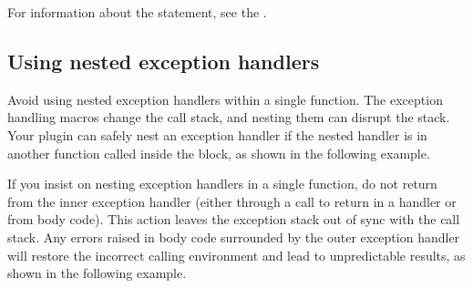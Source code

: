 \documentclass[letterpaper,12pt,english,openany,oneside]{sphinxmanual}
\begin{document}
\begin{sphinxVerbatim}[commandchars=\\\{\}]
  
    
      
\end{sphinxVerbatim}

For information about the  statement, see the .


\subsection{Using nested exception handlers}
\label{\detokenize{Plugins_Exceptions:using-nested-exception-handlers}}
Avoid using nested exception handlers within a single function. The exception handling macros change the call stack, and nesting them can disrupt the stack. Your plugin can safely nest an exception handler if the nested handler is in another function called inside the  block, as shown in the following example.

\begin{sphinxVerbatim}[commandchars=\\\{\}]
      
\end{sphinxVerbatim}

If you insist on nesting exception handlers in a single function, do not return from the inner exception handler (either through a call to return in a handler or  from body code). This action leaves the exception stack out of sync with the call stack. Any errors raised in body code surrounded by the outer exception handler will restore the incorrect calling environment and lead to unpredictable results, as shown in the following example.
\end{document}
